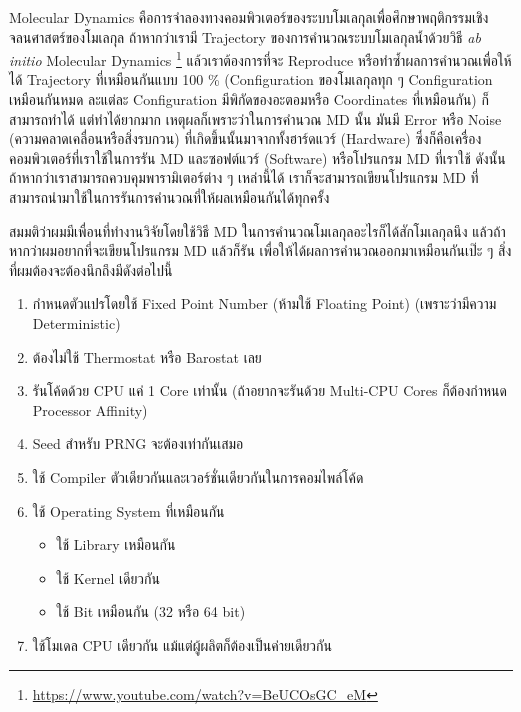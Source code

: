 Molecular Dynamics คือการจำลองทางคอมพิวเตอร์ของระบบโมเลกุลเพื่อศึกษาพฤติกรรมเชิงจลนศาสตร์ของโมเลกุล ถ้าหากว่าเรามี Trajectory
ของการคำนวณระบบโมเลกุลน้ำด้วยวิธี \textit{ab initio} Molecular Dynamics%
\footnote{\url{https://www.youtube.com/watch?v=BeUCOsGC_eM}}
แล้วเราต้องการที่จะ Reproduce หรือทำซ้ำผลการคำนวณเพื่อให้ได้ Trajectory ที่เหมือนกันแบบ 100 \% (Configuration ของโมเลกุลทุก ๆ
Configuration เหมือนกันหมด ละแต่ละ Configuration มีพิกัดของอะตอมหรือ Coordinates ที่เหมือนกัน) ก็สามารถทำได้ แต่ทำได้ยากมาก
เหตุผลก็เพราะว่าในการคำนวณ MD นั้น มันมี Error หรือ Noise (ความคลาดเคลื่อนหรือสิ่งรบกวน) ที่เกิดขึ้นนั้นมาจากทั้งฮาร์ดแวร์ (Hardware)
ซึ่งก็คือเครื่องคอมพิวเตอร์ที่เราใช้ในการรัน MD และซอฟต์แวร์ (Software) หรือโปรแกรม MD ที่เราใช้ ดังนั้นถ้าหากว่าเราสามารถควบคุมพารามิเตอร์ต่าง ๆ
เหล่านี้ได้ เราก็จะสามารถเขียนโปรแกรม MD ที่สามารถนำมาใช้ในการรันการคำนวณที่ให้ผลเหมือนกันได้ทุกครั้ง

สมมติว่าผมมีเพื่อนที่ทำงานวิจัยโดยใช้วิธี MD ในการคำนวณโมเลกุลอะไรก็ได้สักโมเลกุลนึง แล้วถ้าหากว่าผมอยากที่จะเขียนโปรแกรม MD แล้วก็รัน%
เพื่อให้ได้ผลการคำนวณออกมาเหมือนกันเป๊ะ ๆ สิ่งที่ผมต้องจะต้องนึกถึงมีดังต่อไปนี้

\begin{enumerate}[topsep=0pt,noitemsep]
  \setlength\itemsep{0.5em}
  \item กำหนดตัวแปรโดยใช้ Fixed Point Number (ห้ามใช้ Floating Point) (เพราะว่ามีความ Deterministic)

  \item ต้องไม่ใช้ Thermostat หรือ Barostat เลย

  \item รันโค้ดด้วย CPU แค่ 1 Core เท่านั้น (ถ้าอยากจะรันด้วย Multi-CPU Cores ก็ต้องกำหนด Processor Affinity)

  \item Seed สำหรับ PRNG จะต้องเท่ากันเสมอ

  \item ใช้ Compiler ตัวเดียวกันและเวอร์ชั่นเดียวกันในการคอมไพล์โค้ด

  \item ใช้ Operating System ที่เหมือนกัน
        \begin{itemize}[topsep=0pt,noitemsep]
          \setlength\itemsep{0.5em}
          \item ใช้ Library เหมือนกัน

          \item ใช้ Kernel เดียวกัน

          \item ใช้ Bit เหมือนกัน (32 หรือ 64 bit)
        \end{itemize}

  \item ใช้โมเดล CPU เดียวกัน แม้แต่ผู้ผลิตก็ต้องเป็นค่ายเดียวกัน
\end{enumerate}

